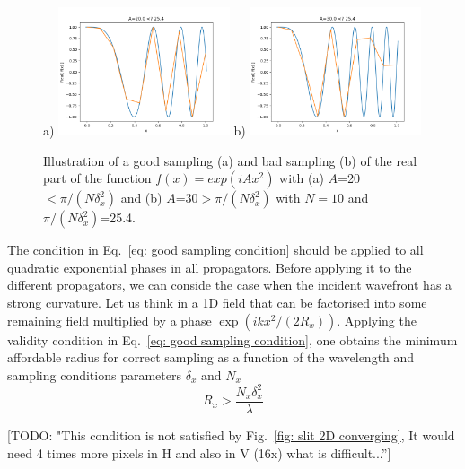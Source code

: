 \documentclass{iucr}              %
\newcommand{\todo}[1]{{\color{red}[TODO: "#1'']}}
\begin{document}
\begin{figure}
\label{fig: phase sampling}
\caption{Illustration of a good sampling (a) and bad sampling (b) of the real part of the function $f(x)=exp(i A x^2)$ with (a) $A$=20$< \pi / (N \delta_x^2)$ and (b) $A$=30$ > \pi / (N \delta_x^2)$ with $N=10$ and $\pi / (N \delta_x^2)$=25.4. 
}
a)
\includegraphics[width=0.45\textwidth]{sample_quadratic_phase_A20.png}
b)
\includegraphics[width=0.45\textwidth]{sample_quadratic_phase_A30.png}
\end{figure}

The condition in Eq.~\ref{eq: good sampling condition} should be applied to all quadratic exponential phases in all propagators. Before applying it to the different propagators, we can conside the case when the incident wavefront has a strong curvature. Let us think in a 1D
field that can be factorised into some remaining field multiplied by a phase $\exp(i k x^2 /  (2 R_x))$. Applying the validity condition in Eq.~\ref{eq: good sampling condition}, one obtains the minimum affordable radius for correct sampling as a function of the wavelength and sampling conditions parameters $\delta_x$ and $N_x$
\begin{equation}
    R_x > \frac{N_x \delta_x^2}{\lambda}
\end{equation}

\todo{This condition is not satisfied by Fig.~\ref{fig: slit 2D converging}, It would need 4 times more pixels in H and also in V (16x) what is difficult...}
\end{document}
